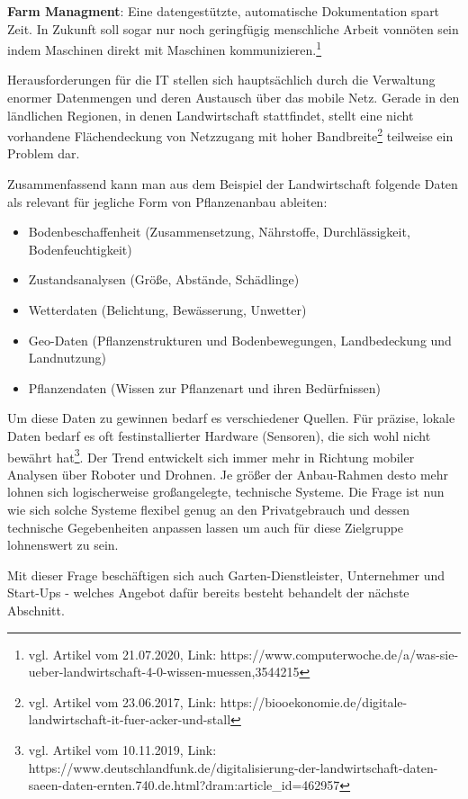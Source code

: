 \textbf{Farm Managment}: Eine datengestützte, automatische Dokumentation
spart Zeit. In Zukunft soll sogar nur noch geringfügig menschliche
Arbeit vonnöten sein indem Maschinen direkt mit Maschinen
kommunizieren.\footnote{vgl. Artikel vom 21.07.2020, Link:
  https://www.computerwoche.de/a/was-sie-ueber-landwirtschaft-4-0-wissen-muessen,3544215}

Herausforderungen für die IT stellen sich hauptsächlich durch die
Verwaltung enormer Datenmengen und deren Austausch über das mobile Netz.
Gerade in den ländlichen Regionen, in denen Landwirtschaft stattfindet,
stellt eine nicht vorhandene Flächendeckung von Netzzugang mit hoher
Bandbreite\footnote{vgl. Artikel vom 23.06.2017, Link:
  https://biooekonomie.de/digitale-landwirtschaft-it-fuer-acker-und-stall}
teilweise ein Problem dar.

Zusammenfassend kann man aus dem Beispiel der Landwirtschaft folgende
Daten als relevant für jegliche Form von Pflanzenanbau ableiten:

\begin{itemize}
\tightlist
\item
  Bodenbeschaffenheit (Zusammensetzung, Nährstoffe, Durchlässigkeit,
  Bodenfeuchtigkeit)
\item
  Zustandsanalysen (Größe, Abstände, Schädlinge)
\item
  Wetterdaten (Belichtung, Bewässerung, Unwetter)
\item
  Geo-Daten (Pflanzenstrukturen und Bodenbewegungen, Landbedeckung und
  Landnutzung)
\item
  Pflanzendaten (Wissen zur Pflanzenart und ihren Bedürfnissen)
\end{itemize}

Um diese Daten zu gewinnen bedarf es verschiedener Quellen. Für präzise,
lokale Daten bedarf es oft festinstallierter Hardware (Sensoren), die
sich wohl nicht bewährt hat\footnote{vgl. Artikel vom 10.11.2019, Link:
  https://www.deutschlandfunk.de/digitalisierung-der-landwirtschaft-daten-saeen-daten-ernten.740.de.html?dram:article\_id=462957}.
Der Trend entwickelt sich immer mehr in Richtung mobiler Analysen über
Roboter und Drohnen. Je größer der Anbau-Rahmen desto mehr lohnen sich
logischerweise großangelegte, technische Systeme. Die Frage ist nun wie
sich solche Systeme flexibel genug an den Privatgebrauch und dessen
technische Gegebenheiten anpassen lassen um auch für diese Zielgruppe
lohnenswert zu sein.

Mit dieser Frage beschäftigen sich auch Garten-Dienstleister,
Unternehmer und Start-Ups - welches Angebot dafür bereits besteht
behandelt der nächste Abschnitt.

